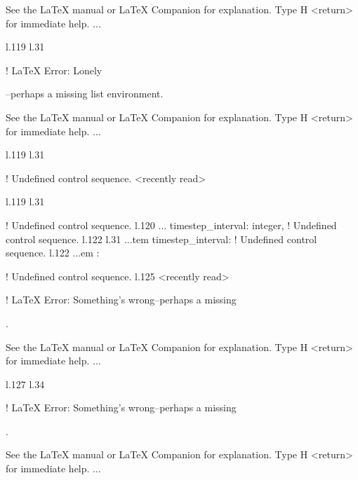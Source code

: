 {{{{{{{{{{{{{{{{{{See the LaTeX manual or LaTeX Companion for explanation.
Type  H <return>  for immediate help.
 ...                                              
                                                  
l.119 l.31     \item \xmlNode
                             

! LaTeX Error: Lonely \item--perhaps a missing list environment.

See the LaTeX manual or LaTeX Companion for explanation.
Type  H <return>  for immediate help.
 ...                                              
                                                  
l.119 l.31     \item \xmlNode
                             
! Undefined control sequence.
<recently read> \xmlNode 
                         
l.119 l.31     \item \xmlNode
                             
! Undefined control sequence.
l.120 ...           {timestep\_interval}: \xmlDesc
                                                  {integer},
! Undefined control sequence.
l.122 l.31 ...tem \xmlNode
                          {timestep\_interval}: \xmlDesc
! Undefined control sequence.
l.122 ...em : \xmlDesc
                                                  
! Undefined control sequence.
l.125 <recently read> \xmlNode
                              

! LaTeX Error: Something's wrong--perhaps a missing \item.

See the LaTeX manual or LaTeX Companion for explanation.
Type  H <return>  for immediate help.
 ...                                              
                                                  
l.127 l.34     \item \xmlNode
                             

! LaTeX Error: Something's wrong--perhaps a missing \item.

See the LaTeX manual or LaTeX Companion for explanation.
Type  H <return>  for immediate help.
 ...                                              
                                                  
}}}}}}}}}}}}}}}}}}
